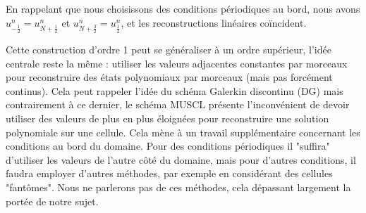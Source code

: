 En rappelant que nous choisissons des conditions périodiques au bord, nous avons $u_{-\frac{1}{2}}^n = u_{N+\frac{1}{2}}^n$ et $u_{N+\frac{3}{2}}^n = u_{\frac{1}{2}}^n$, et les reconstructions linéaires coïncident.


\begin{remarkbox}
\begin{remark}
    Cette construction d'ordre 1 peut se généraliser à un ordre supérieur, l'idée centrale reste la même : utiliser les valeurs adjacentes constantes par morceaux pour reconstruire des états polynomiaux par morceaux (mais pas forcément continus). Cela peut rappeler l'idée du schéma Galerkin discontinu (DG) mais contrairement à ce dernier, le schéma MUSCL présente l'inconvénient de devoir utiliser des valeurs de plus en plus éloignées pour reconstruire une solution polynomiale sur une cellule. Cela mène à un travail supplémentaire concernant les conditions au bord du domaine. Pour des conditions périodiques il "suffira" d'utiliser les valeurs de l'autre côté du domaine, mais pour d'autres conditions, il faudra employer d'autres méthodes, par exemple en considérant des cellules "fantômes". Nous ne parlerons pas de ces méthodes, cela dépassant largement la portée de notre sujet.
\end{remark}
\end{remarkbox}












